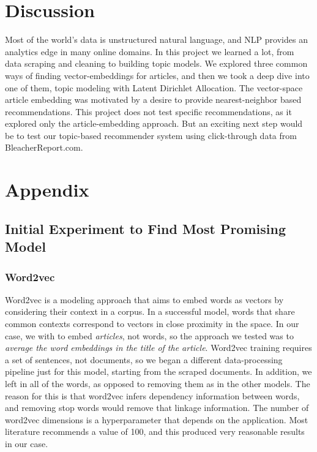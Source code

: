 \documentclass[11pt]{article}
\begin{document}
\section{Discussion}
Most of the world's data is unstructured natural language, and NLP provides an analytics edge in many online domains.  In this project we learned a lot, from data scraping and cleaning to building topic models. We explored three common ways of finding vector-embeddings for articles, and then we took a deep dive into one of them, topic modeling with Latent Dirichlet Allocation. The vector-space article embedding was motivated by a desire to provide nearest-neighbor based recommendations.  This project does not test specific recommendations, as it explored only the article-embedding approach.  But an exciting next step would be to test our topic-based recommender system using click-through data from BleacherReport.com.

\newpage

\section{Appendix}
\subsection{Initial Experiment to Find Most Promising Model}
\subsubsection{Word2vec}
Word2vec is a modeling approach that aims to embed words as vectors by considering their context in a corpus.  In a successful model, words that share common contexts correspond to vectors in close proximity in the space.  In our case, we with to embed \textit{articles}, not words,  so the approach we tested was to \textit{average the word embeddings in the title of the article}. 
Word2vec training requires a set of sentences, not documents, so we began a different data-processing pipeline just for this model, starting from the scraped documents. In addition, we left in all of the words, as opposed to removing them as in the other models. The reason for this is that word2vec infers dependency information between words, and removing stop words would remove that linkage information.
The number of word2vec dimensions is a hyperparameter that depends on the application. Most literature recommends a value of 100, and this produced very reasonable results in our case.
\end{document}

